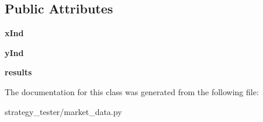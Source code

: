 \subsection*{\-Public \-Attributes}
\begin{DoxyCompactItemize}
\item 
\hypertarget{classstrategy__tester_1_1market__data_1_1pairs__md_a1e4d96904a35947a391f382c2b688aa7}{{\bfseries x\-Ind}}\label{classstrategy__tester_1_1market__data_1_1pairs__md_a1e4d96904a35947a391f382c2b688aa7}

\item 
\hypertarget{classstrategy__tester_1_1market__data_1_1pairs__md_ae55166a8a78c04adad922be486a247ab}{{\bfseries y\-Ind}}\label{classstrategy__tester_1_1market__data_1_1pairs__md_ae55166a8a78c04adad922be486a247ab}

\item 
\hypertarget{classstrategy__tester_1_1market__data_1_1pairs__md_ad8141063e638b45b3ce064af98076611}{{\bfseries results}}\label{classstrategy__tester_1_1market__data_1_1pairs__md_ad8141063e638b45b3ce064af98076611}

\end{DoxyCompactItemize}


\-The documentation for this class was generated from the following file\-:\begin{DoxyCompactItemize}
\item 
strategy\-\_\-tester/market\-\_\-data.\-py\end{DoxyCompactItemize}
